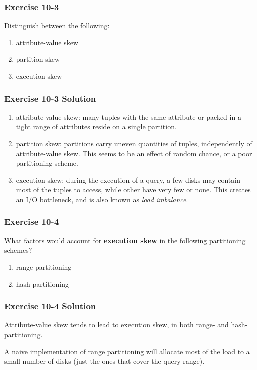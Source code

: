 \begin{frame}
\frametitle{Exercise 10-3}

Distinguish between the following:

\begin{enumerate}
  \item attribute-value skew
  \item partition skew
  \item execution skew
\end{enumerate}

\end{frame}


\begin{frame}
\frametitle{Exercise 10-3 Solution}

\begin{enumerate}
  \item attribute-value skew: many tuples with the same attribute or packed in a tight range of attributes reside on a single partition.
  \item partition skew: partitions carry uneven quantities of tuples, independently of attribute-value skew. This seems to be an effect of random chance, or a poor partitioning scheme.
  \item execution skew: during the execution of a query, a few disks may contain most of the tuples to access, while other have very few or none. This creates an I/O bottleneck, and is also known as \textit{load imbalance}.
\end{enumerate}

\end{frame}


\begin{frame}
\frametitle{Exercise 10-4}

What factors would account for \textbf{execution skew} in the following partitioning schemes?

\begin{enumerate}
  \item range partitioning
  \item hash partitioning
\end{enumerate}

\end{frame}


\begin{frame}
\frametitle{Exercise 10-4 Solution}

Attribute-value skew tends to lead to execution skew, in both range- and hash- partitioning.

A naive implementation of range partitioning will allocate most of the load to a small number of disks (just the ones that cover the query range).

\end{frame}


